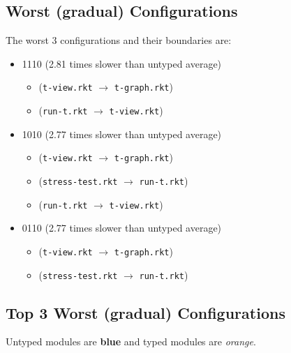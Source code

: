 \documentclass{article}
\newcommand{\mono}[1]{\texttt{#1}}
\begin{document}
\subsection{Worst (gradual) Configurations}
The worst 3 configurations and their boundaries are:
\begin{itemize}
\item 1110 (2.81 times slower than untyped average)
  \begin{itemize}
  \item (\mono{t-view.rkt} $\rightarrow$ \mono{t-graph.rkt})
  \item (\mono{run-t.rkt} $\rightarrow$ \mono{t-view.rkt})
  \end{itemize}
\item 1010 (2.77 times slower than untyped average)
  \begin{itemize}
  \item (\mono{t-view.rkt} $\rightarrow$ \mono{t-graph.rkt})
  \item (\mono{stress-test.rkt} $\rightarrow$ \mono{run-t.rkt})
  \item (\mono{run-t.rkt} $\rightarrow$ \mono{t-view.rkt})
  \end{itemize}
\item 0110 (2.77 times slower than untyped average)
  \begin{itemize}
  \item (\mono{t-view.rkt} $\rightarrow$ \mono{t-graph.rkt})
  \item (\mono{stress-test.rkt} $\rightarrow$ \mono{run-t.rkt})
  \end{itemize}
\end{itemize}

\subsection{Top 3 Worst (gradual) Configurations}
Untyped modules are \textbf{blue} and typed modules are \emph{orange}.
\end{document}

